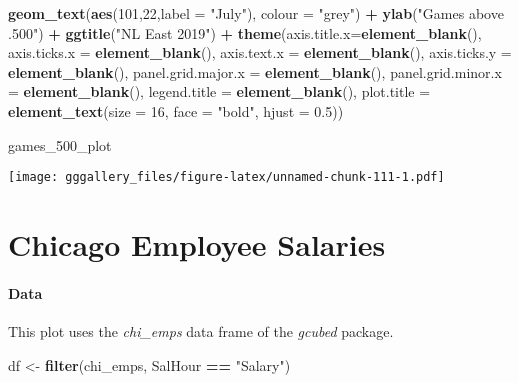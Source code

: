 \documentclass[]{book}
\newenvironment{Shaded}{\begin{snugshade}}{\end{snugshade}}
\newcommand{\DataTypeTok}[1]{\textcolor[rgb]{0.13,0.29,0.53}{#1}}
\newcommand{\DecValTok}[1]{\textcolor[rgb]{0.00,0.00,0.81}{#1}}
\newcommand{\FloatTok}[1]{\textcolor[rgb]{0.00,0.00,0.81}{#1}}
\newcommand{\KeywordTok}[1]{\textcolor[rgb]{0.13,0.29,0.53}{\textbf{#1}}}
\newcommand{\NormalTok}[1]{#1}
\newcommand{\OperatorTok}[1]{\textcolor[rgb]{0.81,0.36,0.00}{\textbf{#1}}}
\newcommand{\StringTok}[1]{\textcolor[rgb]{0.31,0.60,0.02}{#1}}
\begin{document}
\begin{Shaded}
\begin{Highlighting}[]
\StringTok{  }\KeywordTok{geom_text}\NormalTok{(}\KeywordTok{aes}\NormalTok{(}\DecValTok{101}\NormalTok{,}\DecValTok{22}\NormalTok{,}\DataTypeTok{label =} \StringTok{"July"}\NormalTok{), }\DataTypeTok{colour =} \StringTok{"grey"}\NormalTok{) }\OperatorTok{+}
\StringTok{  }\KeywordTok{ylab}\NormalTok{(}\StringTok{"Games above .500"}\NormalTok{) }\OperatorTok{+}
\StringTok{  }\KeywordTok{ggtitle}\NormalTok{(}\StringTok{"NL East 2019"}\NormalTok{) }\OperatorTok{+}
\StringTok{  }\KeywordTok{theme}\NormalTok{(}\DataTypeTok{axis.title.x=}\KeywordTok{element_blank}\NormalTok{(),}
        \DataTypeTok{axis.ticks.x =} \KeywordTok{element_blank}\NormalTok{(),}
        \DataTypeTok{axis.text.x =} \KeywordTok{element_blank}\NormalTok{(),}
        \DataTypeTok{axis.ticks.y =} \KeywordTok{element_blank}\NormalTok{(),}
        \DataTypeTok{panel.grid.major.x =} \KeywordTok{element_blank}\NormalTok{(),}
        \DataTypeTok{panel.grid.minor.x =} \KeywordTok{element_blank}\NormalTok{(),}
        \DataTypeTok{legend.title =} \KeywordTok{element_blank}\NormalTok{(),}
        \DataTypeTok{plot.title =} \KeywordTok{element_text}\NormalTok{(}\DataTypeTok{size =} \DecValTok{16}\NormalTok{, }\DataTypeTok{face =} \StringTok{"bold"}\NormalTok{, }\DataTypeTok{hjust =} \FloatTok{0.5}\NormalTok{))}


\NormalTok{games_}\DecValTok{500}\NormalTok{_plot}
\end{Highlighting}
\end{Shaded}

\texttt{[image: gggallery\_files/figure-latex/unnamed-chunk-111-1.pdf]}

\hypertarget{chihist}{%
\chapter*{Chicago Employee Salaries}\label{chihist}}

\hypertarget{chihistdata}{%
\subsubsection*{Data}\label{chihistdata}}

This plot uses the \emph{chi\_emps} data frame of the \emph{gcubed} package.

\begin{Shaded}
\begin{Highlighting}[]
\NormalTok{df <-}\StringTok{ }\KeywordTok{filter}\NormalTok{(chi_emps, SalHour }\OperatorTok{==}\StringTok{ "Salary"}\NormalTok{)}
\end{Highlighting}
\end{Shaded}
\end{document}
